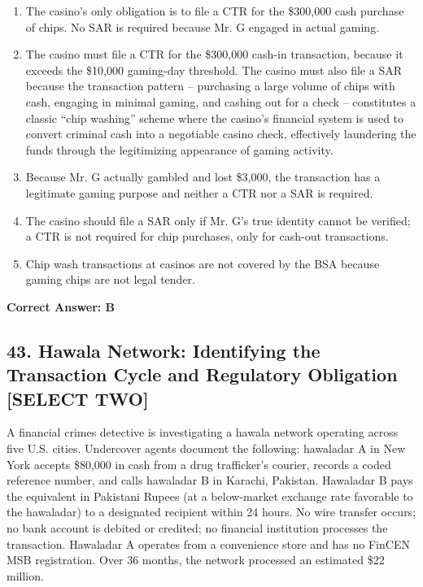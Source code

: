 \documentclass[11pt,a4paper]{article}
\begin{document}
	\begin{enumerate}[label=\Alph*.]
		\item The casino's only obligation is to file a CTR for the \$300,000 cash purchase of chips. No SAR is required because Mr. G engaged in actual gaming.
		\item The casino must file a CTR for the \$300,000 cash-in transaction, because it exceeds the \$10,000 gaming-day threshold. The casino must also file a SAR because the transaction pattern -- purchasing a large volume of chips with cash, engaging in minimal gaming, and cashing out for a check -- constitutes a classic ``chip washing'' scheme where the casino's financial system is used to convert criminal cash into a negotiable casino check, effectively laundering the funds through the legitimizing appearance of gaming activity.
		\item Because Mr. G actually gambled and lost \$3,000, the transaction has a legitimate gaming purpose and neither a CTR nor a SAR is required.
		\item The casino should file a SAR only if Mr. G's true identity cannot be verified; a CTR is not required for chip purchases, only for cash-out transactions.
		\item Chip wash transactions at casinos are not covered by the BSA because gaming chips are not legal tender.
	\end{enumerate}
	\textbf{Correct Answer: B}
	
	\subsection{43. Hawala Network: Identifying the Transaction Cycle and Regulatory Obligation \textnormal{[SELECT TWO]}}
	
	A financial crimes detective is investigating a hawala network operating across five U.S. cities. Undercover agents document the following: hawaladar A in New York accepts \$80,000 in cash from a drug trafficker's courier, records a coded reference number, and calls hawaladar B in Karachi, Pakistan. Hawaladar B pays the equivalent in Pakistani Rupees (at a below-market exchange rate favorable to the hawaladar) to a designated recipient within 24 hours. No wire transfer occurs; no bank account is debited or credited; no financial institution processes the transaction. Hawaladar A operates from a convenience store and has no FinCEN MSB registration. Over 36 months, the network processed an estimated \$22 million.
	
\end{document}
